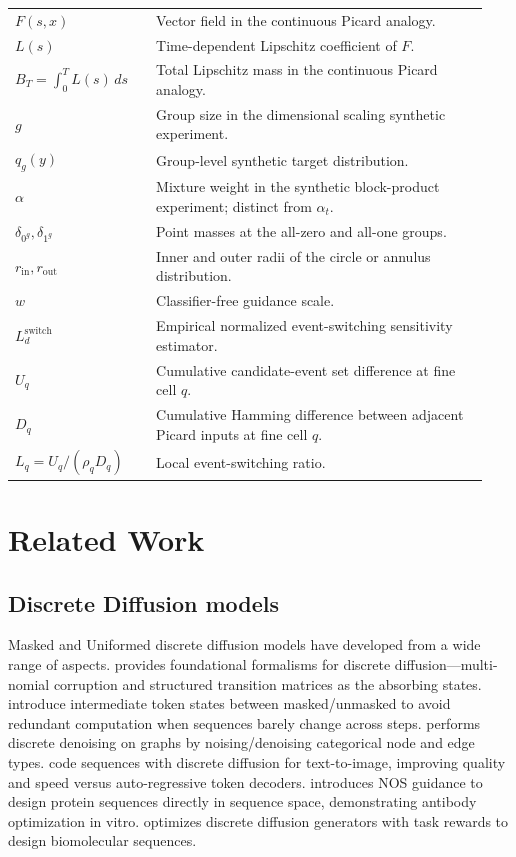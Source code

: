 \documentclass{article}
\begin{document}
\begin{longtable}{p{0.28\linewidth}p{0.66\linewidth}}
\(F(s,x)\) & Vector field in the continuous Picard analogy. \\
\(L(s)\) & Time-dependent Lipschitz coefficient of \(F\). \\
\(B_T=\int_0^TL(s)\,ds\) & Total Lipschitz mass in the continuous Picard analogy. \\
\(g\) & Group size in the dimensional scaling synthetic experiment. \\
\(q_g(y)\) & Group-level synthetic target distribution. \\
\(\alpha\) & Mixture weight in the synthetic block-product experiment; distinct from \(\alpha_t\). \\
\(\delta_{0^g},\delta_{1^g}\) & Point masses at the all-zero and all-one groups. \\
\(r_{\mathrm{in}},r_{\mathrm{out}}\) & Inner and outer radii of the circle or annulus distribution. \\
\(w\) & Classifier-free guidance scale. \\
\(L_d^{\mathrm{switch}}\) & Empirical normalized event-switching sensitivity estimator. \\
\(U_q\) & Cumulative candidate-event set difference at fine cell \(q\). \\
\(D_q\) & Cumulative Hamming difference between adjacent Picard inputs at fine cell \(q\). \\
\(L_q=U_q/(\rho_qD_q)\) & Local event-switching ratio. \\

\end{longtable}



\section{Related Work}
\label{app:related}
\subsection{Discrete Diffusion models}
Masked and Uniformed discrete diffusion models have developed from a wide range of aspects.  \citep{austin2021structured} provides foundational formalisms for discrete diffusion—multi-nomial corruption and structured transition matrices as the absorbing states.  \citep{chao2025beyond} introduce intermediate token states between masked/unmasked to avoid redundant computation when sequences barely change across steps. \citep{vignac2022digres} performs discrete denoising on graphs by noising/denoising categorical node and edge types. \citep{gu2022vector} code sequences with discrete diffusion for text-to-image, improving quality and speed versus auto-regressive token decoders. \citep{gruver2023protein} introduces NOS guidance to design protein sequences directly in sequence space, demonstrating antibody optimization in vitro. \citep{wang2024fine} optimizes discrete diffusion generators with task rewards to design biomolecular sequences.
\end{document}
